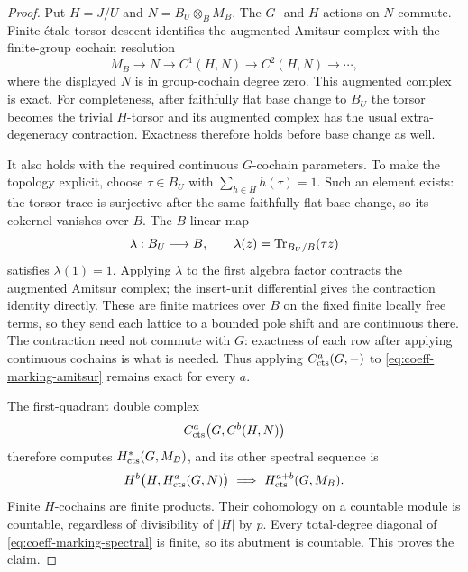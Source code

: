 \begin{proof}
Put $H=J/U$ and $N=B_U\otimes_B M_B$.  The $G$- and $H$-actions on $N$
commute.  Finite \'etale torsor descent identifies the augmented Amitsur
complex with the finite-group cochain resolution
\begin{equation}\label{eq:coeff-marking-amitsur}
 M_B\longrightarrow N\longrightarrow C^1(H,N)
 \longrightarrow C^2(H,N)\longrightarrow\cdots,
\end{equation}
where the displayed $N$ is in group-cochain degree zero.  This augmented
complex is exact.  For completeness, after faithfully flat base change
to $B_U$ the torsor becomes the trivial $H$-torsor and its augmented
complex has the usual extra-degeneracy contraction.  Exactness therefore
holds before base change as well.

It also holds with the required continuous $G$-cochain parameters.
To make the topology explicit, choose
$\tau\in B_U$ with $\sum_{h\in H}h(\tau)=1$.  Such an element exists:
the torsor trace is surjective after the same faithfully flat base
change, so its cokernel vanishes over $B$.  The $B$-linear map
\[
 \lambda:B_U\longrightarrow B,\qquad
 \lambda(z)=\operatorname{Tr}_{B_U/B}(\tau z)
\]
satisfies $\lambda(1)=1$.  Applying $\lambda$ to the first algebra
factor contracts the augmented Amitsur complex; the insert-unit
differential gives the contraction identity directly.  These are
finite matrices over $B$ on the fixed finite locally free terms, so
they send each lattice to a bounded pole shift and are continuous
there.  The contraction need not commute with $G$: exactness of each
row after applying continuous cochains is what is needed.  Thus applying $C^a_{\mathrm{cts}}(G,-)$ to
\eqref{eq:coeff-marking-amitsur} remains exact for every $a$.

The first-quadrant double complex
\[
 C^a_{\mathrm{cts}}\bigl(G,C^b(H,N)\bigr)
\]
therefore computes $H^*_{\mathrm{cts}}(G,M_B)$, and its other spectral sequence is
\begin{equation}\label{eq:coeff-marking-spectral}
 H^b\bigl(H,H^a_{\mathrm{cts}}(G,N)\bigr)
 \ \Longrightarrow\ H^{a+b}_{\mathrm{cts}}(G,M_B).
\end{equation}
Finite $H$-cochains are finite products.  Their cohomology on a countable
module is countable, regardless of divisibility of $|H|$ by $p$.
Every total-degree diagonal of \eqref{eq:coeff-marking-spectral} is
finite, so its abutment is countable.  This proves the claim.
\end{proof}

